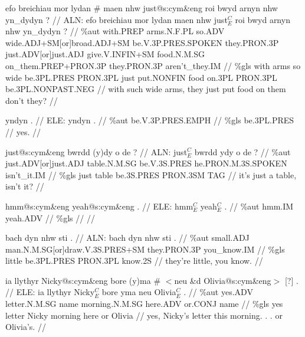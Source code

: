 \documentclass[a4paper,10pt]{article}
\begin{document}
\ex
\begingl[lingstyle=gergl]
\glchat efo breichiau mor lydan \# maen nhw just@s:cym\&eng roi bwyd arnyn nhw yn\_dydyn ? //
\glsurface ALN:  efo breichiau mor lydan maen nhw just$^{C}_{E}$ roi bwyd arnyn nhw yn\_dydyn ?  //
\glauto \%aut  with{\scriptsize .PREP} arms{\scriptsize .N.F.PL} so{\scriptsize .ADV} wide{\scriptsize .ADJ+SM[or]broad.ADJ+SM} be{\scriptsize .V.3P.PRES.SPOKEN} they{\scriptsize .PRON.3P} just{\scriptsize .ADV[or]just.ADJ} give{\scriptsize .V.INFIN+SM} food{\scriptsize .N.M.SG} on\_them{\scriptsize .PREP+PRON.3P} they{\scriptsize .PRON.3P} aren't\_they{\scriptsize .IM}   //
\glmanual \%gls  with arms so wide be{\scriptsize .3PL.PRES} PRON{\scriptsize .3PL} just put{\scriptsize .NONFIN} food on{\scriptsize .3PL} PRON{\scriptsize .3PL} be{\scriptsize .3PL.NONPAST.NEG}   //
\gleng with such wide arms, they just put food on them don't they? //
\endgl
\xe

\ex
\begingl[lingstyle=gergl]
\glchat yndyn . //
\glsurface ELE:  yndyn .  //
\glauto \%aut  be{\scriptsize .V.3P.PRES.EMPH}   //
\glmanual \%gls  be{\scriptsize .3PL.PRES}   //
\gleng yes. //
\endgl
\xe

\ex
\begingl[lingstyle=gergl]
\glchat just@s:cym\&eng bwrdd (y)dy o de ? //
\glsurface ALN:  just$^{C}_{E}$ bwrdd ydy o de ?  //
\glauto \%aut  just{\scriptsize .ADV[or]just.ADJ} table{\scriptsize .N.M.SG} be{\scriptsize .V.3S.PRES} he{\scriptsize .PRON.M.3S.SPOKEN} isn't\_it{\scriptsize .IM}   //
\glmanual \%gls  just table be{\scriptsize .3S.PRES} PRON{\scriptsize .3SM} TAG   //
\gleng it's just a table, isn't it? //
\endgl
\xe

\ex
\begingl[lingstyle=gergl]
\glchat hmm@s:cym\&eng yeah@s:cym\&eng . //
\glsurface ELE:  hmm$^{C}_{E}$ yeah$^{C}_{E}$ .  //
\glauto \%aut  hmm{\scriptsize .IM} yeah{\scriptsize .ADV}   //
\glmanual \%gls      //
\gleng  //
\endgl
\xe

\ex
\begingl[lingstyle=gergl]
\glchat bach dyn nhw sti . //
\glsurface ALN:  bach dyn nhw sti .  //
\glauto \%aut  small{\scriptsize .ADJ} man{\scriptsize .N.M.SG[or]draw.V.3S.PRES+SM} they{\scriptsize .PRON.3P} you\_know{\scriptsize .IM}   //
\glmanual \%gls  little be{\scriptsize .3PL.PRES} PRON{\scriptsize .3PL} know{\scriptsize .2S}   //
\gleng they're little, you know. //
\endgl
\xe

\ex
\begingl[lingstyle=gergl]
\glchat ia llythyr Nicky@s:cym\&eng bore (y)ma \# $<$neu \&d Olivia@s:cym\&eng$>$ [?] . //
\glsurface ELE:  ia llythyr Nicky$^{C}_{E}$ bore yma neu Olivia$^{C}_{E}$ .  //
\glauto \%aut  yes{\scriptsize .ADV} letter{\scriptsize .N.M.SG} name morning{\scriptsize .N.M.SG} here{\scriptsize .ADV} or{\scriptsize .CONJ} name   //
\glmanual \%gls  yes letter Nicky morning here or Olivia   //
\gleng yes, Nicky's letter this morning. . . or Olivia's. //
\endgl
\xe
\end{document}
